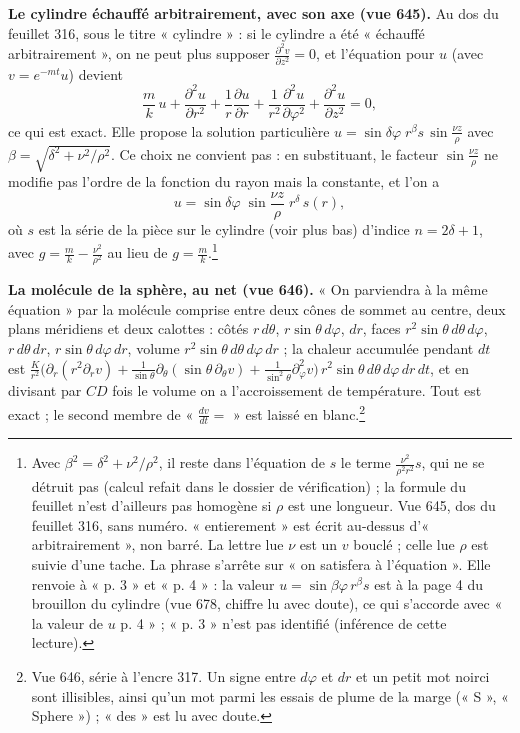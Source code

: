 \documentclass[11pt,a4paper]{article}
\begin{document}
\textbf{Le cylindre échauffé arbitrairement, avec son axe (vue 645).} Au dos du
feuillet 316, sous le titre « cylindre » : si le cylindre a été « échauffé
arbitrairement », on ne peut plus supposer $\frac{\partial^2 v}{\partial z^2} =
0$, et l'équation pour $u$ (avec $v = e^{-mt}u$) devient
\[
\frac{m}{k}\,u + \frac{\partial^2 u}{\partial r^2} + \frac1r\frac{\partial
u}{\partial r} + \frac{1}{r^2}\frac{\partial^2 u}{\partial\varphi^2} +
\frac{\partial^2 u}{\partial z^2} = 0,
\]
ce qui est exact. Elle propose la solution particulière $u = \sin\delta\varphi
\;r^\beta s\,\sin\frac{\nu z}{\rho}$ avec $\beta = \sqrt{\delta^2 +
\nu^2/\rho^2}$. Ce choix ne convient pas : en substituant, le facteur $\sin
\frac{\nu z}{\rho}$ ne modifie pas l'ordre de la fonction du rayon mais la
constante, et l'on a
\[
u = \sin\delta\varphi\;\sin\frac{\nu z}{\rho}\;r^{\delta}\,s(r),
\]
où $s$ est la série de la pièce sur le cylindre (voir plus bas) d'indice
$n = 2\delta + 1$, avec $g = \frac{m}{k} - \frac{\nu^2}{\rho^2}$ au lieu de
$g = \frac mk$.\footnote{Avec $\beta^2 = \delta^2 + \nu^2/\rho^2$, il reste
dans l'équation de $s$ le terme $\frac{\nu^2}{\rho^2 r^2}s$, qui ne se détruit
pas (calcul refait dans le dossier de vérification) ; la formule du feuillet
n'est d'ailleurs pas homogène si $\rho$ est une longueur. Vue 645, dos du
feuillet 316, sans numéro. « entierement » est écrit au-dessus
d'« arbitrairement », non barré. La lettre lue $\nu$ est un $v$ bouclé ;
celle lue $\rho$ est suivie d'une tache. La phrase s'arrête sur « on
satisfera à l'équation ». Elle renvoie à « p. 3 » et « p. 4 » : la valeur $u =
\sin\beta\varphi\,r^\beta s$ est à la page 4 du brouillon du cylindre (vue 678,
chiffre lu avec doute), ce qui s'accorde avec « la valeur de $u$ p. 4 » ;
« p. 3 » n'est pas identifié (inférence de cette lecture).}

\textbf{La molécule de la sphère, au net (vue 646).} « On parviendra à la même
équation » par la molécule comprise entre deux cônes de sommet au centre, deux
plans méridiens et deux calottes : côtés $r\,d\theta$, $r\sin\theta\,d\varphi$,
$dr$, faces $r^2\sin\theta\,d\theta\,d\varphi$, $r\,d\theta\,dr$,
$r\sin\theta\,d\varphi\,dr$, volume $r^2\sin\theta\,d\theta\,d\varphi\,dr$ ; la
chaleur accumulée pendant $dt$ est
$\frac{K}{r^2}\big(\partial_r(r^2\partial_r v) + \frac{1}{\sin\theta}
\partial_\theta(\sin\theta\,\partial_\theta v) + \frac{1}{\sin^2\theta}
\partial_\varphi^2 v\big)\,r^2\sin\theta\,d\theta\,d\varphi\,dr\,dt$, et en
divisant par $CD$ fois le volume on a l'accroissement de température. Tout est
exact ; le second membre de « $\frac{dv}{dt} =$ » est laissé en
blanc.\footnote{Vue 646, série à l'encre 317. Un signe entre $d\varphi$ et $dr$
et un petit mot noirci sont illisibles, ainsi qu'un mot parmi les essais de
plume de la marge (« S », « Sphere ») ; « des » est lu avec doute.}
\end{document}
